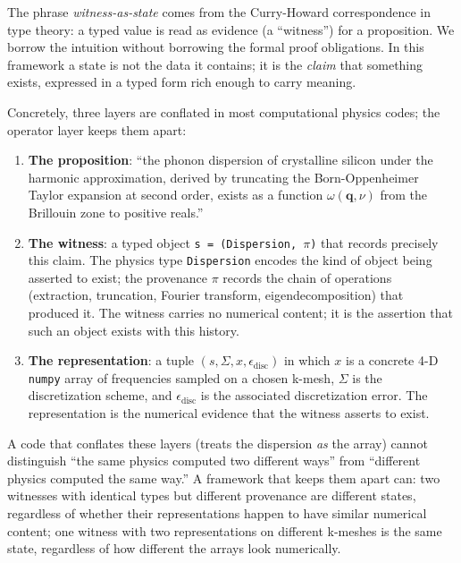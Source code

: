 \documentclass[11pt,a4paper]{article}
\begin{document}
The phrase \emph{witness-as-state} comes from the Curry-Howard correspondence in type theory:
a typed value is read as evidence (a ``witness'') for a proposition. We borrow the intuition
without borrowing the formal proof obligations. In this framework a state is not the data it
contains; it is the \emph{claim} that something exists, expressed in a typed form rich enough
to carry meaning.

Concretely, three layers are conflated in most computational physics codes; the operator layer keeps
them apart:

\begin{enumerate}[leftmargin=2em]
  \item \textbf{The proposition}: ``the phonon dispersion of crystalline silicon under the
        harmonic approximation, derived by truncating the Born-Oppenheimer Taylor expansion at
        second order, exists as a function $\omega(\mathbf{q}, \nu)$ from the Brillouin zone to
        positive reals.''
  \item \textbf{The witness}: a typed object \texttt{s = (Dispersion, $\pi$)} that records
        precisely this claim. The physics type \texttt{Dispersion} encodes the kind of object
        being asserted to exist; the provenance $\pi$ records the chain of operations
        (extraction, truncation, Fourier transform, eigendecomposition) that produced it. The
        witness carries no numerical content; it is the assertion that such an object exists
        with this history.
  \item \textbf{The representation}: a tuple $(s, \Sigma, x, \epsilon_{\text{disc}})$ in
        which $x$ is a concrete 4-D \texttt{numpy} array of frequencies sampled on a chosen
        k-mesh, $\Sigma$ is the discretization scheme, and $\epsilon_{\text{disc}}$ is the
        associated discretization error. The representation is the numerical evidence that the
        witness asserts to exist.
\end{enumerate}

A code that conflates these layers (treats the dispersion \emph{as} the array) cannot
distinguish ``the same physics computed two different ways'' from ``different physics computed
the same way.'' A framework that keeps them apart can: two witnesses with identical types but
different provenance are different states, regardless of whether their representations happen
to have similar numerical content; one witness with two representations on different k-meshes
is the same state, regardless of how different the arrays look numerically.
\end{document}
